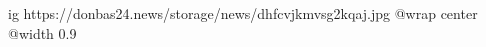  
 
 
 
 

\ifcmt
  ig https://donbas24.news/storage/news/dhfcvjkmvsg2kqaj.jpg
  @wrap center
  @width 0.9
\fi
